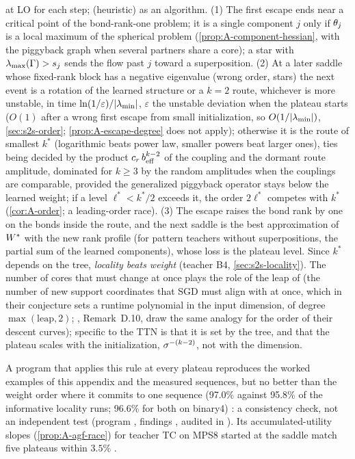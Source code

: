 \begin{remark}\label{rem:A-sequence}
  \derived{} at LO for each step; \conjecture{} (heuristic) as an algorithm. \newresult{}
  (1) The first escape ends near a critical point of the bond-rank-one problem; it is a single component
  $j$ only if $\theta_j$ is a local maximum of the spherical problem (\cref{prop:A-component-hessian}, with
  the piggyback graph when several partners share a core); a star with $\lambda_{\max}(\Gamma)>s_{j}$ sends the
  flow past $j$ toward a superposition. (2) At a later saddle whose fixed-rank block has a negative
  eigenvalue (wrong order, stars) the next event is a rotation of the learned structure or a $k=2$ route,
  whichever is more unstable, in time $\ln(1/\varepsilon)/\lvert\lambda_{\min}\rvert$, $\varepsilon$ the unstable deviation when the
  plateau starts ($O(1)$ after a wrong first escape from small initialization, so $O(1/\lvert\lambda_{\min}\rvert)$,
  \cref{sec:s2s-order}; \cref{prop:A-escape-degree} does not apply);
  otherwise it is the route of smallest $k^*$ (logarithmic beats power law, smaller powers beat larger
  ones), ties being decided by the product $c_r\,b_{\rm eff}^{k-2}$ of the coupling and the dormant route
  amplitude, dominated for $k\ge3$ by the random amplitudes when the couplings are comparable, provided the
  generalized piggyback operator stays below the learned weight; if a
  level $\ell^*<k^*/2$ exceeds it, the order $2\ell^*$ competes with $k^*$ (\cref{cor:A-order}; a
  leading-order race). (3) The escape raises the bond rank by one on the bonds inside the route, and
  the next saddle is the best approximation of $W^{*}$ with the new rank profile (for pattern teachers
  without superpositions, the partial sum of the learned components), whose loss is the plateau level. Since $k^*$
  depends on the tree, \emph{locality beats weight} (teacher B4, \cref{sec:s2s-locality}). The number of cores
  that must change at once plays the role of the leap of \citet{abbe2023sgd} (the number of new support
  coordinates that SGD must align with at once, which in their conjecture sets a runtime polynomial in the
  input dimension, of degree $\max(\text{leap},2)$; \citealp{furman2026benign}, Remark~D.10, draw the same
  analogy for the order of their descent curves); specific to the TTN is that it is set by the tree, and that
  the plateau scales with the initialization, $\sigma^{-(k-2)}$, not with the dimension.
\end{remark}
A program that applies this rule at every plateau reproduces the worked examples of this appendix and the
measured sequences, but no better than the weight order where it commits to one sequence (97.0\% against
95.8\% of the informative locality runs; 96.6\% for both on binary4) \empirical: a consistency check, not an
independent test (program , findings , audited in
). Its accumulated-utility slopes (\cref{prop:A-agf-race})
for teacher TC on MPS8 started at the saddle match five plateaus within $3.5\%$ \empirical.

